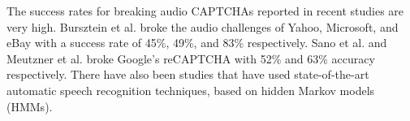 The success rates for breaking audio CAPTCHAs reported in recent studies are very high. Bursztein et al. \cite{bursztein2011failure} broke the audio challenges of Yahoo, Microsoft, and eBay with a success rate of 45\%, 49\%, and 83\% respectively. Sano et al. \cite{sano2013solving} and Meutzner et al. \cite{meutzner2014using} broke Google's reCAPTCHA with 52\% and 63\% accuracy respectively. There have also been studies that have used state-of-the-art automatic speech recognition techniques, based on hidden Markov models (HMMs).


